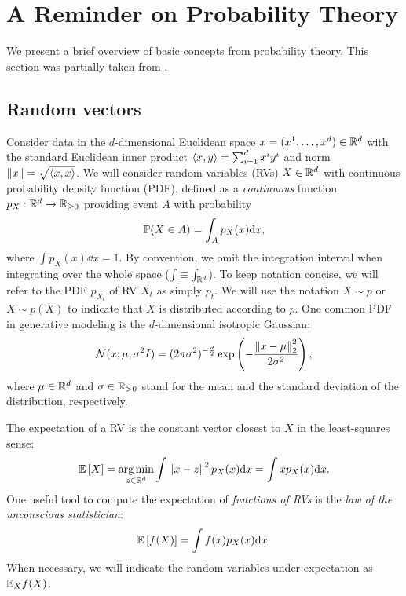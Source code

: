 \section{A Reminder on Probability Theory}
\label{appendix:prob_theory_reminder}
We present a brief overview of basic concepts from probability theory. This section was partially taken from \citep{lipman2024flow}.
\subsection{Random vectors}

Consider data in the $d$-dimensional Euclidean space $x=(x^1,\ldots,x^d)\in \mathbb R^d$ with the standard Euclidean inner product $\left \langle x,y \right \rangle=\sum_{i=1}^d x^i y^i$ and norm $\left\Vert x\right\Vert=\sqrt{\left \langle x,x \right \rangle}$.
%
We will consider random variables (RVs) $X\in\mathbb{R}^d$ with continuous probability density function (PDF), defined as a \emph{continuous} function $p_X:\mathbb R^d\rightarrow \mathbb R_{\geq 0}$ providing event $A$ with probability
%
\begin{equation}
    {\mathbb{P}}(X\in A) = \int_A p_X(x) \mathrm{d} x,
\end{equation}
%
where $\int p_X(x)\dd x = 1$.
%
By convention, we omit the integration interval when integrating over the whole space ($\int \equiv \int_{\mathbb R^d}$).
%
To keep notation concise, we will refer to the PDF $p_{X_t}$ of RV $X_t$ as simply $p_t$.
%
We will use the notation $X \sim p$ or $X \sim p(X)$ to indicate that $X$ is distributed according to $p$.
%
One common PDF in generative modeling is the $d$-dimensional isotropic Gaussian:
%
\begin{equation}\label{e:gaussian}
  {\mathcal{N}}(x;\mu,\sigma^2 I) = (2\pi\sigma^2)^{-\frac{d}{2}}\exp\left(-\frac{\left\Vert x-\mu\right\Vert_2^2}{2\sigma^2}\right),
\end{equation}
%
where $\mu\in \mathbb R^d$ and $\sigma \in \mathbb R_{>0}$ stand for the mean and the standard deviation of the distribution, respectively.

%

The expectation of a RV is the constant vector closest to $X$ in the least-squares sense:
%
\begin{equation}\label{e:E}
    \E\brac{X}=\argmin_{z\in\Real^d} \int \norm{x-z}^2 p_X(x)\dd x = \int x p_X(x)\dd x. %
\end{equation}
%
One useful tool to compute the expectation of \emph{functions of RVs} is the \emph{law of the unconscious statistician}:
%
%
\begin{equation}\label{e:law_of_uncon_stat}
    \E \brac{f(X)} = \int f(x) p_X(x) \dd x. %
\end{equation}
%
When necessary, we will indicate the random variables under expectation as $\mathbb{E}_{X} f(X)$.


